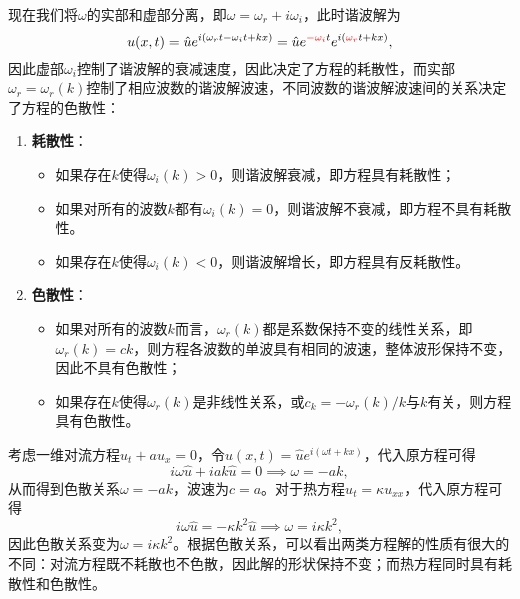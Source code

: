 \documentclass[a4paper,10pt]{ctexart}
\begin{document}
现在我们将$ \omega $的实部和虚部分离，即$ \omega = \omega_r +i\omega_i $，此时谐波解为
\[
    u(x,t) = \hat{u} e^{i(\omega_r t - \omega_i t + kx)} = \hat{u} e^{\textcolor{red}{-\omega_i} t} e^{i(\textcolor{red}{\omega_r} t + kx)},
\]
因此虚部$ \omega_i $控制了谐波解的衰减速度，因此决定了方程的耗散性，而实部$ \omega_r=\omega_r(k) $控制了相应波数的谐波解波速，不同波数的谐波解波速间的关系决定了方程的色散性：
\begin{enumerate}
    \item \textbf{耗散性}：
    \begin{itemize}
        \item 如果存在$ k $使得$ \omega_i(k)>0 $，则谐波解衰减，即方程具有耗散性；
        \item 如果对所有的波数$ k $都有$ \omega_i(k)=0 $，则谐波解不衰减，即方程不具有耗散性。
        \item 如果存在$ k $使得$ \omega_i(k)<0 $，则谐波解增长，即方程具有反耗散性。
    \end{itemize}
    \item \textbf{色散性}：
    \begin{itemize}
        \item 如果对所有的波数$ k $而言，$ \omega_r(k) $都是系数保持不变的线性关系，即$ \omega_r(k) = ck $，则方程各波数的单波具有相同的波速，整体波形保持不变，因此不具有色散性；
        \item 如果存在$ k $使得$ \omega_r(k) $是非线性关系，或$ c_k=-\omega_r(k) / k $与$ k $有关，则方程具有色散性。
    \end{itemize}
\end{enumerate}

\begin{example}
    考虑一维对流方程$ u_t+au_x=0 $，令$ u(x,t) = \hat{u} e^{i(\omega t + kx)} $，代入原方程可得
    \[
        i\omega \hat{u} + iak\hat{u} = 0 \implies \omega = -ak,
    \]
    从而得到色散关系$ \omega = -ak $，波速为$ c=a $。对于热方程$ u_t = \kappa u_{xx} $，代入原方程可得
    \[
        i\omega \hat{u} = -\kappa k^2 \hat{u} \implies \omega = i\kappa k^2,
    \]
    因此色散关系变为$ \omega = i\kappa k^2 $。根据色散关系，可以看出两类方程解的性质有很大的不同：对流方程既不耗散也不色散，因此解的形状保持不变；而热方程同时具有耗散性和色散性。
\end{example}
\end{document}
